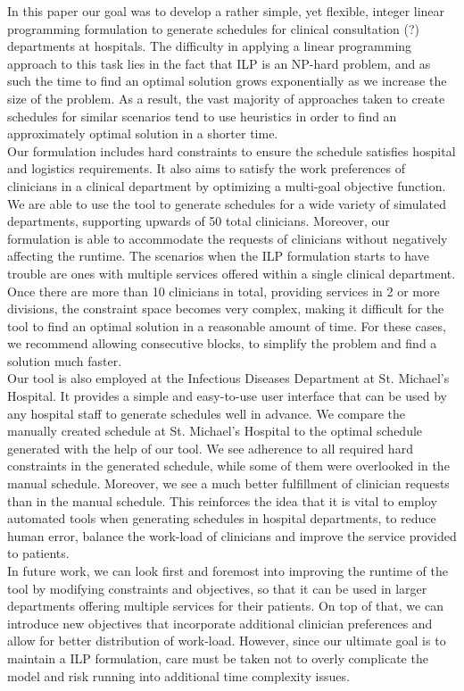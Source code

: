 In this paper our goal was to develop a rather simple, yet flexible, integer linear programming formulation to generate schedules for clinical consultation (?) departments at hospitals. The difficulty in applying a linear programming approach to this task lies in the fact that ILP is an NP-hard problem, and as such the time to find an optimal solution grows exponentially as we increase the size of the problem. As a result, the vast majority of approaches taken to create schedules for similar scenarios tend to use heuristics in order to find an approximately optimal solution in a shorter time. \\

Our formulation includes hard constraints to ensure the schedule satisfies hospital and logistics requirements. It also aims to satisfy the work preferences of clinicians in a clinical department by optimizing a multi-goal objective function. We are able to use the tool to generate schedules for a wide variety of simulated departments, supporting upwards of 50 total clinicians. Moreover, our formulation is able to accommodate the requests of clinicians without negatively affecting the runtime. The scenarios when the ILP formulation starts to have trouble are ones with multiple services offered within a single clinical department. Once there are more than 10 clinicians in total, providing services in 2 or more divisions, the constraint space becomes very complex, making it difficult for the tool to find an optimal solution in a reasonable amount of time. For these cases, we recommend allowing consecutive blocks, to simplify the problem and find a solution much faster. \\

Our tool is also employed at the Infectious Diseases Department at St. Michael's Hospital. It provides a simple and easy-to-use user interface that can be used by any hospital staff to generate schedules well in advance. We compare the manually created schedule at St. Michael's Hospital to the optimal schedule generated with the help of our tool. We see adherence to all required hard constraints in the generated schedule, while some of them were overlooked in the manual schedule. Moreover, we see a much better fulfillment of clinician requests than in the manual schedule. This reinforces the idea that it is vital to employ automated tools when generating schedules in hospital departments, to reduce human error, balance the work-load of clinicians and improve the service provided to patients. \\

In future work, we can look first and foremost into improving the runtime of the tool by modifying constraints and objectives, so that it can be used in larger departments offering multiple services for their patients. On top of that, we can introduce new objectives that incorporate additional clinician preferences and allow for better distribution of work-load. However, since our ultimate goal is to maintain a ILP formulation, care must be taken not to overly complicate the model and risk running into additional time complexity issues.